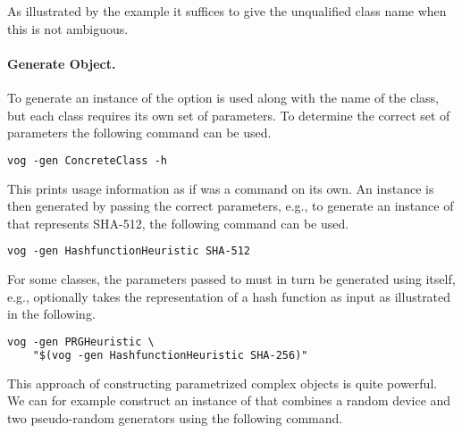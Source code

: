 \documentclass[11pt]{article}
\begin{document}
\vspace{0.2cm}
\noindent
As illustrated by the example it suffices to give the unqualified
class name when this is not ambiguous.

\paragraph{Generate Object.}

To generate an instance of  the  option
is used along with the name of the class, but each class requires its
own set of parameters. To determine the correct set of parameters the
following command can be used.

\vspace{0.3cm}
\begin{lstlisting}[frame=single,language=xml,
basicstyle=\tt,showstringspaces=false]
vog -gen ConcreteClass -h
\end{lstlisting}

\vspace{0.2cm}
\noindent
This prints usage information as if  was
a command on its own. An instance is then generated by passing the
correct parameters, e.g., to generate an instance of
 that represents SHA-512, the following
command can be used.

\vspace{0.3cm}
\begin{lstlisting}[frame=single,language=xml,
basicstyle=\tt,showstringspaces=false]
vog -gen HashfunctionHeuristic SHA-512
\end{lstlisting}

\vspace{0.2cm}
\noindent
For some classes, the parameters passed to \vog{} must in turn be
generated using \vog{} itself, e.g.,  optionally
takes the representation of a hash function as input as illustrated in
the following.

\vspace{0.3cm}
\begin{lstlisting}[frame=single,language=xml,
basicstyle=\tt,showstringspaces=false]
vog -gen PRGHeuristic \
    "$(vog -gen HashfunctionHeuristic SHA-256)"
\end{lstlisting}

\vspace{0.2cm}
\noindent
This approach of constructing parametrized complex objects is quite
powerful. We can for example construct an instance of
 that combines a random device and two pseudo-random
generators using the following command.
\end{document}
